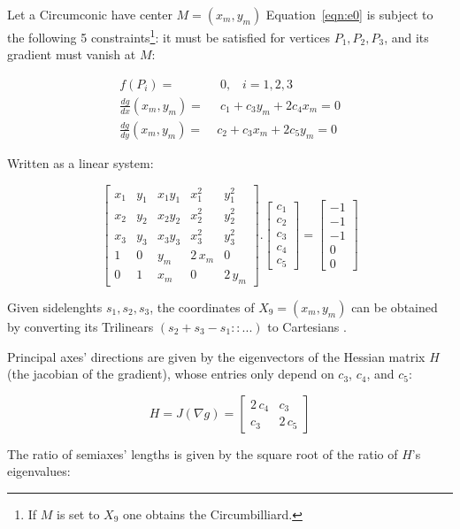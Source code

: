 Let a Circumconic have center $M=(x_m,y_m)$ Equation~\eqref{eqn:e0} is subject to the following 5 constraints\footnote{If $M$ is set to $X_9$ one obtains the Circumbilliard.}: it must be satisfied for vertices $P_1,P_2,P_3$, and its gradient must vanish at $M$:

\begin{align*}
f(P_i)=&\;0,\;\;\;i=1,2,3\\
\frac{dg}{dx}(x_m,y_m)=&\;c_1+c_3 y_m+2c_4 x_m=0\\
\frac{dg}{dy}(x_m,y_m)=\;&c_2+c_3 x_m+2c_5 y_m=0
\end{align*}

Written as a linear system:

$$
\left[
\begin{array}{ccccc}
x_1&y_1&x_1 y_1&x_1^2&y_1^2\\
x_2&y_2&x_2 y_2&x_2^2&y_2^2\\
x_3&y_3&x_3 y_3&x_3^2&y_3^2\\
1&0&y_m&2\,x_m&0\\
0&1&x_m&0&2\,y_m
\end{array}
\right] .
\left[\begin{array}{c}c_1\\c_2\\c_3\\c_4\\c_5\end{array}\right] =
\left[\begin{array}{c}-1\\-1\\-1\\0\\0\end{array}\right]
$$

Given sidelenghts $s_1,s_2,s_3$, the coordinates of $X_9=(x_m,y_m)$ can be obtained by converting its Trilinears $\left(s_2 + s_3 - s_1 :: ...\right)$ to Cartesians \cite{etc}. 

Principal axes' directions are given by the eigenvectors of the Hessian matrix $H$ (the jacobian of the gradient), whose entries only depend on $c_3$, $c_4$, and $c_5$:

\begin{equation}
H = J(\nabla{g})=\left[\begin{array}{cc}2\,c_4&c_3\\c_3&2\,c_5\end{array}\right]
\label{eqn:hessian}
\end{equation}

The ratio of semiaxes' lengths is given by the square root of the ratio of $H$'s eigenvalues:

